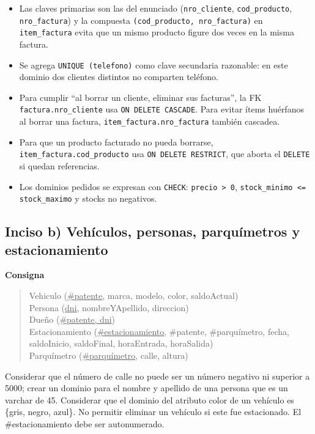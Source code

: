 \documentclass[11pt,a4paper]{article}
\newcommand{\itemcabecera}[1]{\noindent\textbf{#1}\par\medskip}
\newcommand{\bloqueConsigna}{\itemcabecera{Consigna}}
\newenvironment{esquema}{%
    \begin{quote}\ttfamily\small\setlength{\parskip}{0pt}\setlength{\parindent}{0pt}%
}{\end{quote}}
\begin{document}
\begin{itemize}
    \item Las claves primarias son las del enunciado (\texttt{nro\_cliente}, \texttt{cod\_producto}, \texttt{nro\_factura}) y la compuesta \texttt{(cod\_producto, nro\_factura)} en \texttt{item\_factura} evita que un mismo producto figure dos veces en la misma factura.
    \item Se agrega \texttt{UNIQUE (telefono)} como clave secundaria razonable: en este dominio dos clientes distintos no comparten teléfono.
    \item Para cumplir ``al borrar un cliente, eliminar sus facturas'', la FK \texttt{factura.nro\_cliente} usa \texttt{ON DELETE CASCADE}. Para evitar ítems huérfanos al borrar una factura, \texttt{item\_factura.nro\_factura} también cascadea.
    \item Para que un producto facturado no pueda borrarse, \texttt{item\_factura.cod\_producto} usa \texttt{ON DELETE RESTRICT}, que aborta el \texttt{DELETE} si quedan referencias.
    \item Los dominios pedidos se expresan con \texttt{CHECK}: \texttt{precio > 0}, \texttt{stock\_minimo <= stock\_maximo} y stocks no negativos.
\end{itemize}

\subsection{Inciso b) Vehículos, personas, parquímetros y estacionamiento}

\bloqueConsigna

\begin{esquema}
Vehiculo (\underline{\#patente}, marca, modelo, color, saldoActual)\\
Persona (\underline{dni}, nombreYApellido, direccion)\\
Due\~no (\underline{\#patente, dni})\\
Estacionamiento (\underline{\#estacionamiento}, \#patente, \#parqu\'imetro, fecha, saldoInicio, saldoFinal, horaEntrada, horaSalida)\\
Parqu\'imetro (\underline{\#parqu\'imetro}, calle, altura)
\end{esquema}

Considerar que el número de calle no puede ser un número negativo ni superior a 5000; crear un dominio para el nombre y apellido de una persona que es un varchar de 45. Considerar que el dominio del atributo color de un vehículo es \{gris, negro, azul\}. No permitir eliminar un vehículo si este fue estacionado. El \#estacionamiento debe ser autonumerado.
\end{document}
